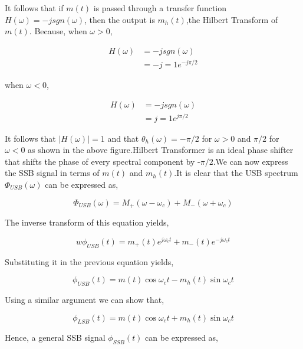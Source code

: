 It follows that if $m(t)$ is passed through a transfer function $H(\omega)=-jsgn(\omega)$, then the output is $m_h(t)$,the Hilbert Transform of $m(t)$.
Because,\newline
when $\omega>0$,

\begin{equation}
\begin{split}
H(\omega) & =-jsgn(\omega) \\
&=-j=1e^{-j\pi/2} 
\end{split}
\end{equation}

when $\omega<0$,

\begin{equation}
\begin{split}
H(\omega) & =-jsgn(\omega) \\
&=j=1e^{j\pi/2} 
\end{split}
\end{equation}

It follows that $|H(\omega)|=1$ and that $\theta_h(\omega)=-\pi/2$ for $\omega>0$ and $\pi/2$ for $\omega<0$ as shown in the above figure.Hilbert Transformer is an ideal phase shifter that shifts the phase of every spectral component by -$\pi/2$.We can now express the SSB signal in terms of $m(t)$ and $m_h(t)$.It is clear that the USB spectrum $\Phi_{USB}(\omega)$ can be expressed as,

\begin{equation}
	\Phi_{USB}(\omega)=M_+(\omega-\omega_c)+M_-(\omega+\omega_c)
\end{equation}

The inverse transform of this equation yields,

\begin{equation}
	w\phi_{USB}(t)=m_+(t)e^{j\omega_ct}+m_-(t)e^{-j\omega_ct}
\end{equation}

Substituting it in the previous equation yields,

\begin{equation}
	\phi_{USB}(t)=m(t)\cos\omega_ct-m_h(t)\sin\omega_ct
\end{equation}

Using a similar argument we can show that,

\begin{equation}
	\phi_{LSB}(t)=m(t)\cos\omega_ct+m_h(t)\sin\omega_ct
\end{equation}

Hence, a general SSB signal $\phi_{SSB}(t)$ can be expressed as,

